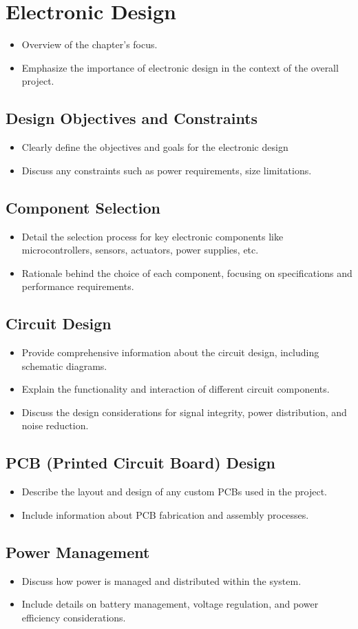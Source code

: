 \chapter{Electronic Design}

\graphicspath{{./Figures/Modeling}}


\begin{itemize}
	\item Overview of the chapter's focus.
	\item Emphasize the importance of electronic design in the context of the overall project.
\end{itemize}


\section{Design Objectives and Constraints}
\begin{itemize}
	\item Clearly define the objectives and goals for the electronic design
	\item Discuss any constraints such as power requirements, size limitations.
\end{itemize}
\section{Component Selection}
\begin{itemize}
	\item Detail the selection process for key electronic components like microcontrollers, sensors, actuators, power supplies, etc.
	\item Rationale behind the choice of each component, focusing on specifications and performance requirements.
\end{itemize}
\section{Circuit Design}
\begin{itemize}
	\item Provide comprehensive information about the circuit design, including schematic diagrams.
	\item Explain the functionality and interaction of different circuit components.
	\item Discuss the design considerations for signal integrity, power distribution, and noise reduction.
\end{itemize}
\section{PCB (Printed Circuit Board) Design}
\begin{itemize}
	\item Describe the layout and design of any custom PCBs used in the project.
	\item Include information about PCB fabrication and assembly processes.
\end{itemize}
\section{Power Management}
\begin{itemize}
	\item Discuss how power is managed and distributed within the system.
	\item Include details on battery management, voltage regulation, and power efficiency considerations.
\end{itemize}